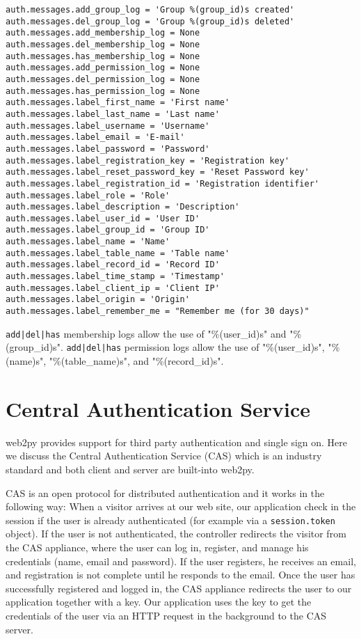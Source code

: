 \documentclass[justified,sixbynine,notoc]{tufte-book}
\def\ft{\small\tt}
\def\inxx#1{\index{#1}}
\begin{document}
\begin{fullwidth}
\begin{lstlisting}
auth.messages.add_group_log = 'Group %(group_id)s created'
auth.messages.del_group_log = 'Group %(group_id)s deleted'
auth.messages.add_membership_log = None
auth.messages.del_membership_log = None
auth.messages.has_membership_log = None
auth.messages.add_permission_log = None
auth.messages.del_permission_log = None
auth.messages.has_permission_log = None
auth.messages.label_first_name = 'First name'
auth.messages.label_last_name = 'Last name'
auth.messages.label_username = 'Username'
auth.messages.label_email = 'E-mail'
auth.messages.label_password = 'Password'
auth.messages.label_registration_key = 'Registration key'
auth.messages.label_reset_password_key = 'Reset Password key'
auth.messages.label_registration_id = 'Registration identifier'
auth.messages.label_role = 'Role'
auth.messages.label_description = 'Description'
auth.messages.label_user_id = 'User ID'
auth.messages.label_group_id = 'Group ID'
auth.messages.label_name = 'Name'
auth.messages.label_table_name = 'Table name'
auth.messages.label_record_id = 'Record ID'
auth.messages.label_time_stamp = 'Timestamp'
auth.messages.label_client_ip = 'Client IP'
auth.messages.label_origin = 'Origin'
auth.messages.label_remember_me = "Remember me (for 30 days)"
\end{lstlisting}
{\ft add|del|has} membership logs allow the use of "\%(user\_id)s" and "\%(group\_id)s".
{\ft add|del|has} permission logs allow the use of "\%(user\_id)s", "\%(name)s", "\%(table\_name)s", and "\%(record\_id)s".

\goodbreak\section{Central Authentication Service}

\inxx{CAS} \inxx{authentication}
\noindent web2py provides support for third party authentication and single sign on.
Here we discuss the Central Authentication Service (CAS) which is an industry standard and both client and server are built-into web2py.

CAS is an open protocol for distributed authentication and it works in the following way: When a visitor arrives at our web site, our application check in the session if the user is already authenticated (for example via a {\ft session.token} object). If the user is not authenticated, the controller redirects the visitor from the CAS appliance, where the user can log in, register, and manage his credentials (name, email and password). If the user registers, he receives an email, and registration is not complete until he responds to the email. Once the user has successfully registered and logged in, the CAS appliance redirects the user to our application together with a key. Our application uses the key to get the credentials of the user via an HTTP request in the background to the CAS server.


\end{fullwidth}
\end{document}
